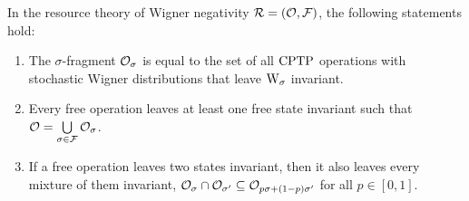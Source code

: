 \begin{theorem}\label{thm:frag}
    In the resource theory of Wigner negativity $\mathcal{R} = (\mathcal{O}, \mathcal{F})$, the following statements hold:
    \begin{enumerate}
        \item The $\sigma$-fragment $\mathcal{O}_\sigma$ is equal to the set of all ${\rm{CPTP}}$ operations with stochastic Wigner distributions that leave $\W{\sigma}$ invariant. 
        \item Every free operation leaves at least one free state invariant such that $\mathcal{O} = \bigcup\limits_{\sigma \in \mathcal{F}} \mathcal{O}_\sigma$.
        \item If a free operation leaves two states invariant, then it also leaves every mixture of them invariant, $\mathcal{O}_{\sigma} \cap \mathcal{O}_{\sigma'} \subseteq \mathcal{O}_{p\sigma + (1-p)\sigma'}$ for all $p \in [0,1]$.
    \end{enumerate}
\end{theorem}
